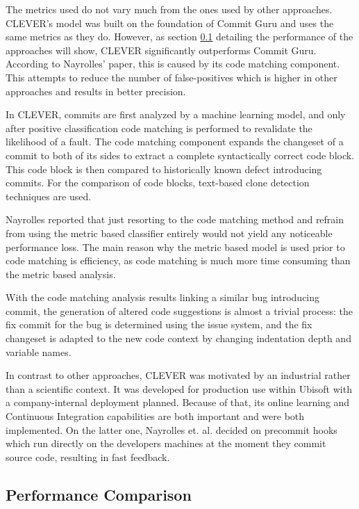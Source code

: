 The metrics used do not vary much from the ones used by other approaches. CLEVER's model was built on the foundation of Commit Guru and uses the same metrics as they do. However, as section \ref{sec:performance} detailing the performance of the approaches will show, CLEVER significantly outperforms Commit Guru. According to Nayrolles' paper, this is caused by its code matching component. This attempts to reduce the number of false-positives which is higher in other approaches and results in better precision.

In CLEVER, commits are first analyzed by a machine learning model, and only after positive classification code matching is performed to revalidate the likelihood of a fault. The code matching component expands the changeset of a commit to both of its sides to extract a complete syntactically correct code block. This code block is then compared to historically known defect introducing commits. For the comparison of code blocks, text-based clone detection techniques are used.

Nayrolles reported that just resorting to the code matching method and refrain from using the metric based classifier entirely would not yield any noticeable performance loss. The main reason why the metric based model is used prior to code matching is efficiency, as code matching is much more time consuming than the metric based analysis.

With the code matching analysis results linking a similar bug introducing commit, the generation of altered code suggestions is almost a trivial process: the fix commit for the bug is determined using the issue system, and the fix changeset is adapted to the new code context by changing indentation depth and variable names.

In contrast to other approaches, CLEVER was motivated by an industrial rather than a scientific context. It was developed for production use within Ubisoft with a company-internal deployment planned. Because of that, its online learning and Continuous Integration capabilities are both important and were both implemented. On the latter one, Nayrolles et. al. decided on precommit hooks which run directly on the developers machines at the moment they commit source code, resulting in fast feedback.


\subsection{Performance Comparison}
\label{sec:performance}

